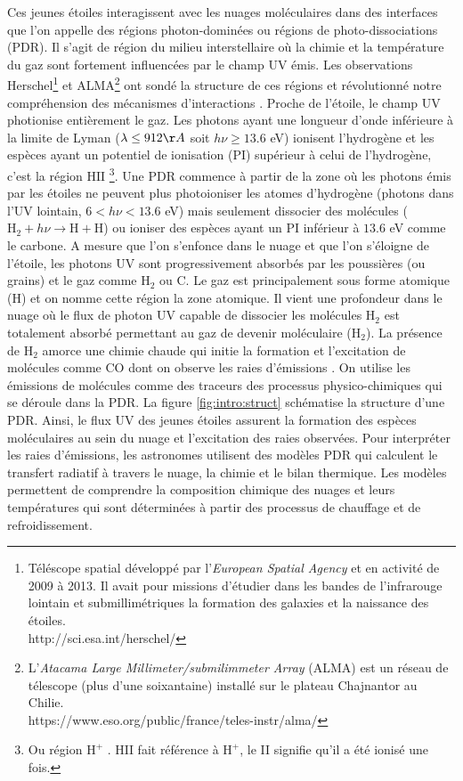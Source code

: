 \documentclass[11pt,a4paper]{article}
\begin{document}
\begin{spacing}{0.98}
Ces jeunes étoiles interagissent avec les nuages moléculaires dans des interfaces que l'on appelle des régions photon-dominées ou régions de photo-dissociations (PDR). Il s'agit de région du milieu interstellaire où la chimie et la température du gaz sont fortement influencées par le champ UV émis. Les observations Herschel\footnote{Téléscope spatial développé par l'\textit{European Spatial Agency} et en activité de 2009 à 2013. Il avait pour missions d'étudier dans les bandes de l'infrarouge lointain et submillimétriques la formation des galaxies et la naissance des étoiles. \\ 
 http://sci.esa.int/herschel/} et ALMA\footnote{
L'\textit{Atacama Large Millimeter/submilimmeter Array} (ALMA) est un réseau de télescope (plus d'une soixantaine) installé sur le plateau Chajnantor au Chilie. \\
 https://www.eso.org/public/france/teles-instr/alma/} ont sondé la structure de ces régions et révolutionné notre compréhension des mécanismes d'interactions \cite{Goicoechea2016, COJoblin}.
Proche de l'étoile, le champ UV photionise entièrement le gaz. Les photons ayant une longueur d'onde inférieure à la limite de Lyman ($\lambda \leq 912 \AA$ soit $h\nu \geq 13.6$ eV) ionisent l'hydrogène et les espèces ayant un potentiel de ionisation (PI) supérieur à celui de l'hydrogène, c'est la \og région $\mathrm{HII}$ \fg{} \footnote{Ou \og région $\mathrm{H}^+$ \fg{}. $\mathrm{HII}$ fait référence à $\mathrm{H}^+$, le II signifie qu'il a été ionisé une fois.}. Une PDR commence à partir de la zone où les photons émis par les étoiles ne peuvent plus photoioniser les atomes d'hydrogène (photons dans l'UV lointain, $6<h\nu<13.6$ eV) mais seulement dissocier des molécules ($\mathrm{H}_2 + h\nu \rightarrow \mathrm{H}+\mathrm{H}$) ou ioniser des espèces ayant un PI inférieur à $13.6$ eV comme le carbone. A mesure que l'on s'enfonce dans le nuage et que l'on s'éloigne de l'étoile, les photons UV sont progressivement absorbés par les poussières (ou grains) et le gaz comme $\mathrm{H}_2$ ou $\mathrm{C}$.
Le gaz est principalement sous forme atomique ($\mathrm{H}$) et on nomme cette région la zone atomique. Il vient une profondeur dans le nuage où le flux de photon UV capable de dissocier les molécules $\mathrm{H}_2$ est totalement absorbé permettant au gaz de devenir moléculaire ($\mathrm{H}_2$). La présence de $\mathrm{H}_2$ amorce une chimie chaude qui initie la formation et l'excitation de molécules comme $\mathrm{CO}$ dont on observe les raies d'émissions \cite{COJoblin}. On utilise les émissions de molécules comme des traceurs des processus physico-chimiques qui se déroule dans la PDR. La figure \ref{fig:intro:struct} schématise la structure d'une PDR. Ainsi, le flux UV des jeunes étoiles assurent la formation des espèces moléculaires au sein du nuage et l'excitation des raies observées. Pour interpréter les raies d'émissions, les astronomes utilisent des modèles PDR qui calculent le transfert radiatif à travers le nuage, la chimie et le bilan thermique. Les modèles permettent de comprendre la composition chimique des nuages et leurs températures qui sont déterminées à partir des processus de chauffage et de refroidissement. \newline 


\end{spacing}
\end{document}
